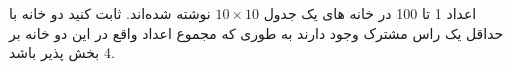 \p    
اعداد 1 تا 100 در خانه های یک جدول 
$10 \times 10$
نوشته شده‌اند. ثابت کنید دو خانه با حداقل یک راس مشترک وجود دارند به طوری که مجموع اعداد واقع در این دو خانه بر 4 بخش پذیر باشد.
